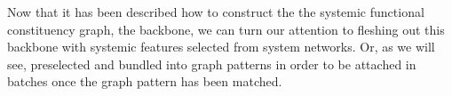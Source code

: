 Now that it has been described how to construct the the systemic functional constituency graph, the backbone, we can turn our attention to fleshing out this backbone with systemic features selected from system networks. Or, as we will see, preselected and bundled into graph patterns in order to be attached in batches once the graph pattern has been matched. 


